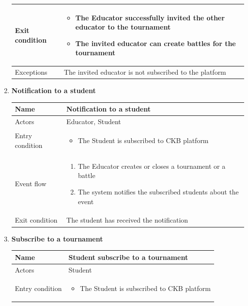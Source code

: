 \begin{enumerate}[label=UC\arabic*:]
\begin{tabular}{|p{3cm}|p{8cm}|}
        Exit condition &
        \begin{itemize}
            \item The Educator successfully invited the other educator to the tournament
            \item The invited educator can create battles for the tournament
        \end{itemize} \\
        \hline
        Exceptions & The invited educator is not subscribed to the platform \\
        \hline
    \end{tabular}
    \item \textbf{Notification to a student} \\
    \begin{tabular}{|p{3cm}|p{8cm}|}
        \hline
        Name & Notification to a student \\
        \hline
        Actors & Educator, Student \\
        \hline
        Entry condition &
        \begin{itemize}
            \item The Student is subscribed to CKB platform
        \end{itemize}
        \\
        \hline
        Event flow &
        \begin{enumerate}[label=\arabic*.]
            \item The Educator creates or closes a tournament or a battle
            \item The system notifies the subscribed students about the event
        \end{enumerate}
        \\
        \hline
        Exit condition & The student has received the notification   \\
        \hline
    \end{tabular}
    \item \textbf{Subscribe to a tournament} \\
    \begin{tabular}{|p{3cm}|p{8cm}|}
        \hline
        Name & Student subscribe to a tournament \\
        \hline
        Actors & Student \\
        \hline
        Entry condition &
        \begin{itemize}
            \item The Student is subscribed to CKB platform

\end{itemize}
\end{tabular}
\end{enumerate}
